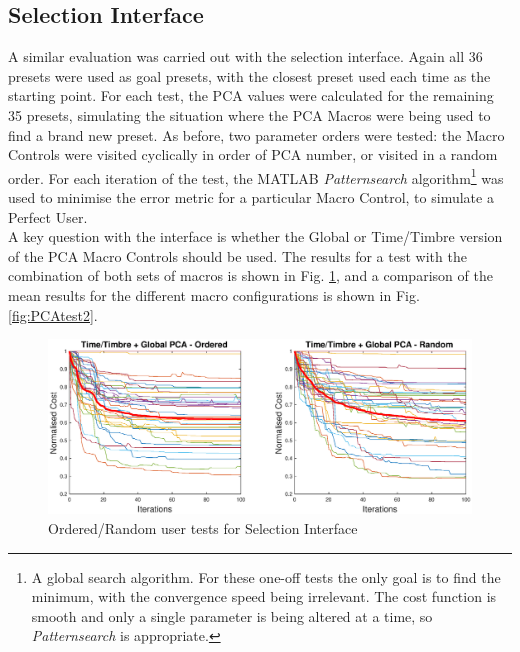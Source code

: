 \documentclass[11pt, oneside]{report}   	%
\begin{document}
\subsection{Selection Interface}\label{sec:SelectionEval}
A similar evaluation was carried out with the selection interface. Again all 36 presets were used as goal presets, with the closest preset used each time as the starting point. For each test, the PCA values were calculated for the remaining 35 presets, simulating the situation where the PCA Macros were being used to find a brand new preset. As before, two parameter orders were tested: the Macro Controls were visited cyclically in order of PCA number, or visited in a random order. For each iteration of the test, the MATLAB \emph{Patternsearch} algorithm\footnote{A global search algorithm. For these one-off tests the only goal is to find the minimum, with the convergence speed being irrelevant. The cost function is smooth and only a single parameter is being altered at a time, so \emph{Patternsearch} is appropriate.} was used to minimise the error metric for a particular Macro Control, to simulate a Perfect User.\\ 
A key question with the interface is whether the Global or Time/Timbre version of the PCA Macro Controls should be used. The results for a test with the combination of both sets of macros is shown in Fig. \ref{fig:PCAtest1}, and a comparison of the mean results for the different macro configurations is shown in Fig. \ref{fig:PCAtest2}.
\begin{figure}

\hspace{-60pt}
	\includegraphics[width = 8in]{PCAInterfaceTests1.eps}
	\caption{Ordered/Random user tests for Selection Interface}
	\label{fig:PCAtest1}
\end{figure}
\end{document}
